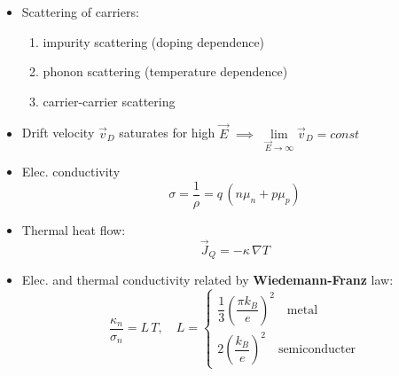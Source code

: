 \begin{itemize}
  \item Scattering of carriers:
        \begin{enumerate}
          \item impurity scattering (doping dependence)
          \item phonon scattering (temperature dependence)
          \item carrier-carrier scattering
        \end{enumerate}
        \item Drift velocity $\vec{v}_{D}$ saturates for high $\vec{E}$ $\implies$ $\lim\limits_{\vec{E} \to \infty} \vec{v}_{D} = const$
  \item Elec. conductivity
        \begin{equation*}
          \sigma = \dfrac{1}{\rho} = q \, (n\mu_{n} + p\mu_{p})
        \end{equation*}
  \item Thermal heat flow:
        \begin{equation*}
          \vec{J}_{Q} = -\kappa \, \nabla T
        \end{equation*}
  \item Elec. and thermal conductivity related by \textbf{Wiedemann-Franz} law:
        \begin{equation*}
          \dfrac{\kappa_{n}}{\sigma_{n}} = L \, T, \quad L = \begin{cases} \dfrac{1}{3}{\left(\dfrac{\pi k_{B}}{e}\right)}^{2} \quad \text{metal}\\ 2{\left(\dfrac{k_{B}}{e}\right)}^{2} \quad \text{semiconducter} \end{cases}
        \end{equation*}
\end{itemize}
